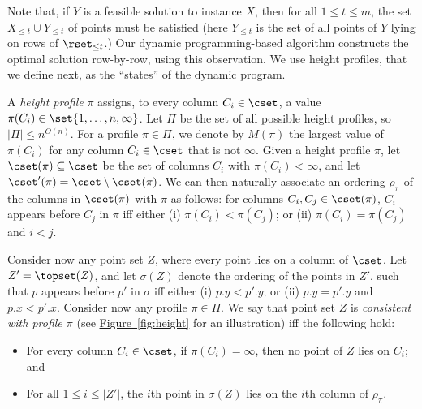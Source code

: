 \documentclass[11pt]{article}
\numberwithin{equation}{section}
\theoremstyle{definition}
\theoremstyle{plain}
\newcommand{\expref}[2]{\hyperref[#2]{#1~\ref{#2}}}
\begin{document}
Note that, if $Y$ is a feasible solution to instance $X$, then for all $1\leq t\leq m$, the set $X_{\leq t}\cup Y_{\leq t}$ of points must be satisfied (here $Y_{\leq t}$ is the set of all points of $Y$ lying on rows of $\rset_{\leq t}$.) Our dynamic programming-based algorithm constructs the optimal solution row-by-row, using this observation. We use height profiles, that we define next, as the ``states'' of the dynamic program.

 
%


A \emph{height profile} $\pi$ assigns, to every column $C_i\in \cset$, a value $\pi(C_i)\in \set{1,\ldots,n,\infty}$. Let $\Pi$ be the set of all possible height profiles, so $|\Pi|\leq n^{O(n)}$. For a profile $\pi\in \Pi$, we denote by $M(\pi)$ the largest value of $\pi(C_i)$ for any column $C_i\in \cset$ that is not $\infty$. Given a height profile $\pi$, let $\cset(\pi)\subseteq \cset$ be the set of columns $C_i$ with $\pi(C_i)<\infty$, and let $\cset'(\pi)=\cset\setminus\cset(\pi)$. We can then naturally associate an ordering $\rho_{\pi}$ of the columns in $\cset(\pi)$ with $\pi$ as follows: for columns $C_i,C_j\in \cset(\pi)$, $C_i$ appears before $C_j$ in $\pi$ iff either  (i) $\pi(C_i)<\pi(C_{j})$; or (ii) $\pi(C_i)=\pi(C_{j})$ and $i<j$.

Consider now any point set $Z$, where every point lies on a column of $\cset$. Let $Z'=\topset(Z)$, and let $\sigma(Z)$ denote the ordering of the points in $Z'$, such that $p$ appears before $p'$ in $\sigma$ iff either (i) $p.y<p'.y$; or (ii) $p.y=p'.y$ and $p.x<p'.x$. 
Consider now any profile  $\pi\in \Pi$.
We say that point set $Z$ is \emph{consistent with profile $\pi$} (see \expref{Figure}{fig:height} for an illustration) iff the following hold:

\begin{itemize}
	\item For every column $C_i\in \cset$, if $\pi(C_i)=\infty$, then no point of $Z$ lies on $C_i$; and
	\item For all $1\leq i\leq |Z'|$, the $i$th point in $\sigma(Z)$ lies on the $i$th column of $\rho_{\pi}$.
\end{itemize}
\end{document}
